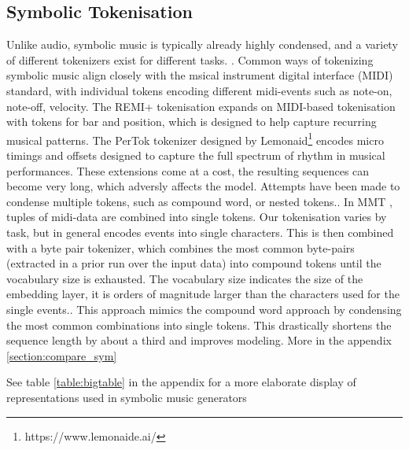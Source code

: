 \subsection{Symbolic Tokenisation}
\label{symbolic tok}
Unlike audio, symbolic music is typically already highly condensed, and a variety of different tokenizers exist for different tasks. \cite{Fradet_Briot_Chhel_2021}. Common ways of tokenizing symbolic music align closely with the msical instrument digital interface (MIDI) standard, with individual tokens encoding different midi-events such as note-on, note-off, velocity. The REMI+ \cite{Huang_Yang_remi_pop_transformer_2020} tokenisation expands on MIDI-based tokenisation with tokens for bar and position, which is designed to help capture recurring musical patterns. The PerTok tokenizer designed by Lemonaid\footnote{https://www.lemonaide.ai/}  encodes micro timings and offsets designed to capture the full spectrum of rhythm in musical performances.
These extensions come at a cost, the resulting sequences can become very long, which adversly affects the model\cite{Ji_Yang_Luo_survey_symbolic_2024}. Attempts have been made to condense multiple tokens, such as compound word, or nested tokens.\cite{Ryu_Dong_nested_2024}. In MMT \cite{Dong_Chen_MMT_Kirkpatrick_2023}, tuples of midi-data are combined into single tokens. Our tokenisation varies by task, but in general encodes events into single characters. This is then combined with a byte pair tokenizer, which combines the most common byte-pairs (extracted in a prior run over the input data) into compound tokens until the vocabulary size is exhausted. The vocabulary size indicates the size of the embedding layer, it is orders of magnitude larger than the characters used for the single events.\cite{Sennrich_Haddow_Birch_BPE_2016}. This approach mimics the compound word approach by condensing the most common combinations into single tokens. This drastically shortens the sequence length by about a third and improves modeling. More in the appendix \ref{section:compare_sym}

See table \ref{table:bigtable} in the appendix for a more elaborate display of representations used in symbolic music generators




